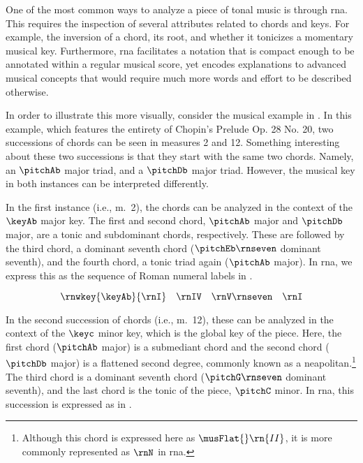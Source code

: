 
One of the most common ways to analyze a piece of tonal
music is through \gls{rna}. This requires the inspection of
several attributes related to chords and keys. For example,
the inversion of a chord, its root, and whether it tonicizes
a momentary musical key. Furthermore, \gls{rna} facilitates
a notation that is compact enough to be annotated within a
regular musical score, yet encodes explanations to advanced
musical concepts that would require much more words and
effort to be described otherwise.

In order to illustrate this more visually, consider the
musical example in . In this
example, which features the entirety of Chopin's Prelude Op.
28 No. 20, two successions of chords can be seen in measures
2 and 12. Something interesting about these two successions
is that they start with the same two chords. Namely, an
$\pitchAb$ major triad, and a $\pitchDb$ major triad.
However, the musical key in both instances can be
interpreted differently.


In the first instance (i.e., m.~2), the chords can be
analyzed in the context of the $\keyAb$ major key. The first
and second chord, $\pitchAb$ major and $\pitchDb$ major, are
a tonic and subdominant chords, respectively. These are
followed by the third chord, a dominant seventh chord
($\pitchEb\rnseven$ dominant seventh), and the fourth chord,
a tonic triad again ($\pitchAb$ major). In \gls{rna}, we
express this as the sequence of Roman numeral labels in
.

\begin{equation}
    \label{eq:succession1}
    \rnwkey{\keyAb}{\rnI} \quad \rnIV \quad \rnV\rnseven \quad \rnI
\end{equation}

In the second succession of chords (i.e., m.~12), these can
be analyzed in the context of the $\keyc$ minor key, which
is the global key of the piece. Here, the first chord
($\pitchAb$ major) is a submediant chord and the second
chord ($\pitchDb$ major) is a flattened second degree,
commonly known as a \gls{neapolitan}.\footnote{Although this
chord is expressed here as $\musFlat{}\rn{II}$, it is more
commonly represented as $\rnN$ in \gls{rna}.} The third
chord is a dominant seventh chord ($\pitchG\rnseven$
dominant seventh), and the last chord is the tonic of the
piece, $\pitchC$ minor. In \gls{rna}, this succession is
expressed as in .

